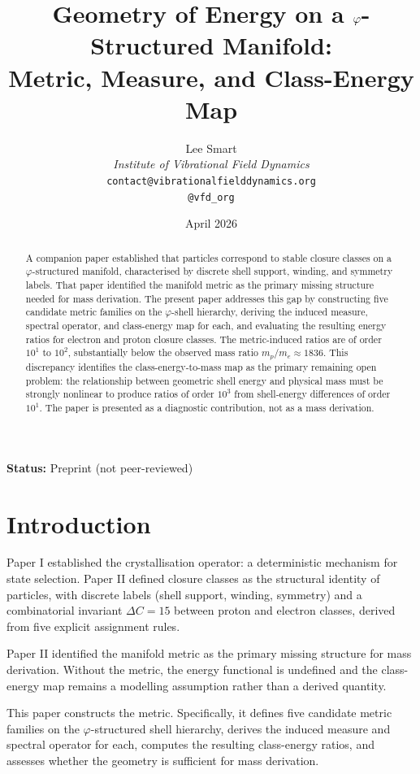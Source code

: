 \documentclass[12pt]{article}
\title{Geometry of Energy on a $\phig$-Structured Manifold:\\Metric, Measure, and Class-Energy Map}
\author{%
  Lee Smart\\[4pt]
  \textit{Institute of Vibrational Field Dynamics}\\[2pt]
  \texttt{contact@vibrationalfielddynamics.org}\\[2pt]
  \texttt{@vfd\_org}%
}
\date{April 2026}
\newcommand{\phig}{\varphi}
\begin{document}
\maketitle

\noindent\textbf{Status:} Preprint (not peer-reviewed)

\begin{abstract}
A companion paper established that particles correspond to stable closure classes on a $\phig$-structured manifold, characterised by discrete shell support, winding, and symmetry labels. That paper identified the manifold metric as the primary missing structure needed for mass derivation. The present paper addresses this gap by constructing five candidate metric families on the $\phig$-shell hierarchy, deriving the induced measure, spectral operator, and class-energy map for each, and evaluating the resulting energy ratios for electron and proton closure classes. The metric-induced ratios are of order $10^1$ to $10^2$, substantially below the observed mass ratio $m_p/m_e \approx 1836$. This discrepancy identifies the class-energy-to-mass map as the primary remaining open problem: the relationship between geometric shell energy and physical mass must be strongly nonlinear to produce ratios of order $10^3$ from shell-energy differences of order $10^1$. The paper is presented as a diagnostic contribution, not as a mass derivation.
\end{abstract}

\section{Introduction}

Paper I \citep{Smart2026} established the crystallisation operator: a deterministic mechanism for state selection. Paper II defined closure classes as the structural identity of particles, with discrete labels (shell support, winding, symmetry) and a combinatorial invariant $\Delta C = 15$ between proton and electron classes, derived from five explicit assignment rules.

Paper II identified the manifold metric as the primary missing structure for mass derivation. Without the metric, the energy functional is undefined and the class-energy map remains a modelling assumption rather than a derived quantity.

This paper constructs the metric. Specifically, it defines five candidate metric families on the $\phig$-structured shell hierarchy, derives the induced measure and spectral operator for each, computes the resulting class-energy ratios, and assesses whether the geometry is sufficient for mass derivation.
\end{document}
